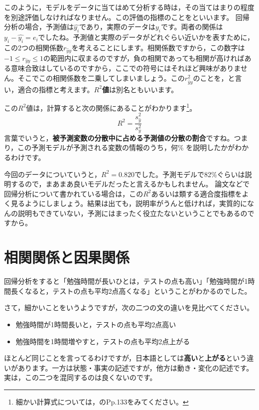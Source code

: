 \documentclass{ltjbook}
\begin{document}
このように，モデルをデータに当てはめて分析する時は，その当てはまりの程度を別途評価しなければなりません。この評価の指標のことをといいます。
回帰分析の場合，予測値は$\hat{y_i}$であり，実際のデータは$y_i$です。両者の関係は$y_i-\hat{y_i}=e_i$でしたね。予測値と実際のデータがどれぐらい近いかを表すために，この2つの相関係数$r_{\hat{y}y}$を考えることにします。相関係数ですから，この数字は$-1\le r_{\hat{y}y} \le 1$の範囲内に収まるのですが，負の相関であっても相関が高ければある意味合致はしているのですから，ここでの符号にはそれほど興味がありません。そこでこの相関係数を二乗してしまいましょう。この$r_{\hat{y}y}^2$のことを，と言い，適合の指標と考えます。\textbf{$R^2$値}は別名ともいいます。

この$R^2$値は，計算すると次の関係にあることがわかります\footnote{細かい計算式については，\textcite{kosugi2018}のPp.133をみてください。}。
\[ R^2 = \frac{s_{\hat{y}}^2}{s_y^2} \]
言葉でいうと，\textbf{被予測変数の分散中に占める予測値の分散の割合}ですね。つまり，この予測モデルが予測される変数の情報のうち，何\% を説明したかがわかるわけです。

今回のデータについていうと，$R^2=0.820$でした。予測モデルで82\%ぐらいは説明するので，まあまあ良いモデルだったと言えるかもしれません。
論文などで回帰分析について書かれている場合は，この$R^2$あるいは類する適合度指標をよく見るようにしましょう。結果は出ても，説明率がうんと低ければ，実質的になんの説明もできていない，予測にはまったく役立たないということでもあるのですから。

\section{相関関係と因果関係}

回帰分析をすると「勉強時間が長いひとは，テストの点も高い」「勉強時間が1時間長くなると，テストの点も平均2点高くなる」ということがわかるのでした。

さて，細かいことをいうようですが，次の二つの文の違いを見比べてください。

\begin{itemize}
    \item 勉強時間が1時間長いと，テストの点も平均2点高い
    \item 勉強時間を1時間増やすと，テストの点も平均2点上がる
\end{itemize}

ほとんど同じことを言ってるわけですが，日本語としては\textbf{高い}と\textbf{上がる}という違いがあります。一方は状態・事実の記述ですが，他方は動き・変化の記述です。実は，この二つを混同するのは良くないのです。
\end{document}
